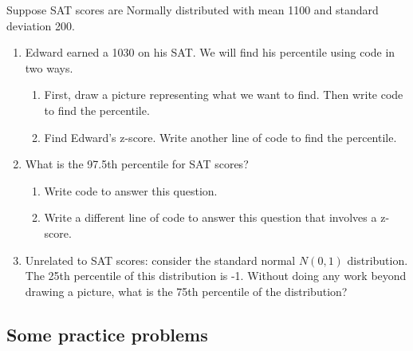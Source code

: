\documentclass[
  letterpaper,
  DIV=11,
  numbers=noendperiod]{scrartcl}
\providecommand{\tightlist}{%
  \setlength{\itemsep}{0pt}\setlength{\parskip}{0pt}}\usepackage{longtable,booktabs,array}
\begin{document}
Suppose SAT scores are Normally distributed with mean 1100 and standard
deviation 200.

\begin{enumerate}
\def\labelenumi{\arabic{enumi}.}
\tightlist
\item
  Edward earned a 1030 on his SAT. We will find his percentile using
  code in two ways.

  \begin{enumerate}
  \def\labelenumii{\alph{enumii}.}
  \tightlist
  \item
    First, draw a picture representing what we want to find. Then write
    code to find the percentile.
  \item
    Find Edward's z-score. Write another line of code to find the
    percentile.
  \end{enumerate}
\item
  What is the 97.5th percentile for SAT scores?

  \begin{enumerate}
  \def\labelenumii{\alph{enumii}.}
  \tightlist
  \item
    Write code to answer this question.
  \item
    Write a different line of code to answer this question that involves
    a z-score.
  \end{enumerate}
\item
  Unrelated to SAT scores: consider the standard normal \(N(0,1)\)
  distribution. The 25th percentile of this distribution is -1. Without
  doing any work beyond drawing a picture, what is the 75th percentile
  of the distribution?
\end{enumerate}

\clearpage

\hypertarget{some-practice-problems}{%
\subsection{Some practice problems}\label{some-practice-problems}}
\end{document}
